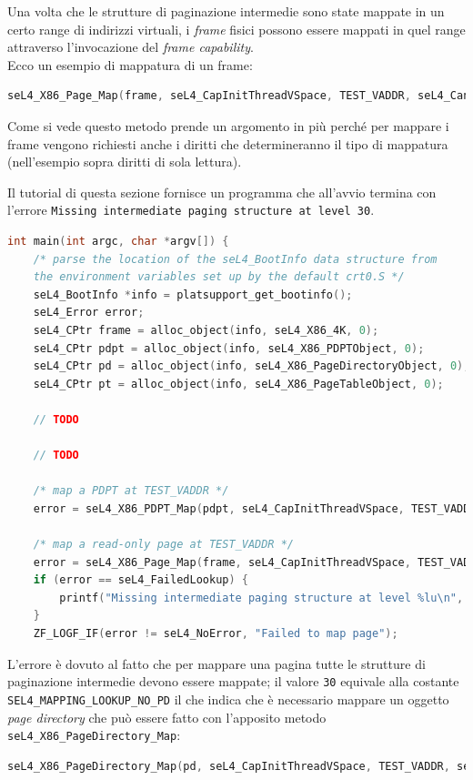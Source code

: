 Una volta che le strutture di paginazione intermedie sono state mappate in un certo range di indirizzi virtuali, i \textit{frame} fisici possono essere mappati in quel range attraverso l'invocazione del \textit{frame capability}.\\
Ecco un esempio di mappatura di un frame:
\begin{lstlisting}[language=C++]
seL4_X86_Page_Map(frame, seL4_CapInitThreadVSpace, TEST_VADDR, seL4_CanRead, seL4_X86_Default_VMAttributes);
\end{lstlisting}

Come si vede questo metodo prende un argomento in più perché per mappare i frame vengono richiesti anche i diritti che determineranno il tipo di mappatura (nell'esempio sopra diritti di sola lettura).

Il tutorial di questa sezione fornisce un programma che all'avvio termina con l'errore \texttt{Missing intermediate paging structure at level 30}.
\begin{lstlisting}[language=C++]
int main(int argc, char *argv[]) {
    /* parse the location of the seL4_BootInfo data structure from
    the environment variables set up by the default crt0.S */
    seL4_BootInfo *info = platsupport_get_bootinfo();
    seL4_Error error;
    seL4_CPtr frame = alloc_object(info, seL4_X86_4K, 0);
    seL4_CPtr pdpt = alloc_object(info, seL4_X86_PDPTObject, 0);
    seL4_CPtr pd = alloc_object(info, seL4_X86_PageDirectoryObject, 0);
    seL4_CPtr pt = alloc_object(info, seL4_X86_PageTableObject, 0);

	// TODO
	
	// TODO

    /* map a PDPT at TEST_VADDR */
    error = seL4_X86_PDPT_Map(pdpt, seL4_CapInitThreadVSpace, TEST_VADDR, seL4_X86_Default_VMAttributes);

    /* map a read-only page at TEST_VADDR */
    error = seL4_X86_Page_Map(frame, seL4_CapInitThreadVSpace, TEST_VADDR, seL4_CanRead, seL4_X86_Default_VMAttributes);
    if (error == seL4_FailedLookup) {
        printf("Missing intermediate paging structure at level %lu\n", seL4_MappingFailedLookupLevel());
    }
    ZF_LOGF_IF(error != seL4_NoError, "Failed to map page");
\end{lstlisting}

L'errore è dovuto al fatto che per mappare una pagina tutte le strutture di paginazione intermedie devono essere mappate; il valore \texttt{30} equivale alla costante \texttt{SEL4\_MAPPING\_LOOKUP\_NO\_PD} il che indica che è necessario mappare un oggetto \textit{page directory} che può essere fatto con l'apposito metodo \texttt{seL4\_X86\_PageDirectory\_Map}:
\begin{lstlisting}[language=C++]
seL4_X86_PageDirectory_Map(pd, seL4_CapInitThreadVSpace, TEST_VADDR, seL4_X86_Default_VMAttributes);
\end{lstlisting}

